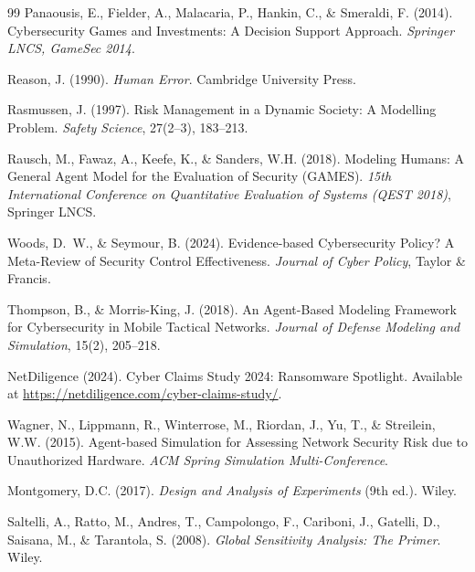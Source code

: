 \documentclass[11pt,a4paper]{article}
\begin{document}
\begin{thebibliography}{99}
Panaousis, E., Fielder, A., Malacaria, P., Hankin, C., \& Smeraldi, F. (2014).
\newblock Cybersecurity Games and Investments: A Decision Support Approach.
\newblock \emph{Springer LNCS, GameSec 2014}.

Reason, J. (1990).
\newblock \emph{Human Error}.
\newblock Cambridge University Press.

Rasmussen, J. (1997).
\newblock Risk Management in a Dynamic Society: A Modelling Problem.
\newblock \emph{Safety Science}, 27(2--3), 183--213.

Rausch, M., Fawaz, A., Keefe, K., \& Sanders, W.H. (2018).
\newblock Modeling Humans: A General Agent Model for the Evaluation of Security (GAMES).
\newblock \emph{15th International Conference on Quantitative Evaluation of Systems (QEST 2018)}, Springer LNCS.

Woods, D.~W., \& Seymour, B. (2024).
\newblock Evidence-based Cybersecurity Policy? A Meta-Review of Security Control Effectiveness.
\newblock \emph{Journal of Cyber Policy}, Taylor \& Francis.

Thompson, B., \& Morris-King, J. (2018).
\newblock An Agent-Based Modeling Framework for Cybersecurity in Mobile Tactical Networks.
\newblock \emph{Journal of Defense Modeling and Simulation}, 15(2), 205--218.


NetDiligence (2024).
\newblock Cyber Claims Study 2024: Ransomware Spotlight.
\newblock Available at \url{https://netdiligence.com/cyber-claims-study/}.

Wagner, N., Lippmann, R., Winterrose, M., Riordan, J., Yu, T., \& Streilein, W.W. (2015).
\newblock Agent-based Simulation for Assessing Network Security Risk due to Unauthorized Hardware.
\newblock \emph{ACM Spring Simulation Multi-Conference}.

Montgomery, D.C. (2017).
\newblock \emph{Design and Analysis of Experiments} (9th ed.).
\newblock Wiley.

Saltelli, A., Ratto, M., Andres, T., Campolongo, F., Cariboni, J., Gatelli, D., Saisana, M., \& Tarantola, S. (2008).
\newblock \emph{Global Sensitivity Analysis: The Primer}.
\newblock Wiley.

\end{thebibliography}
\end{document}
